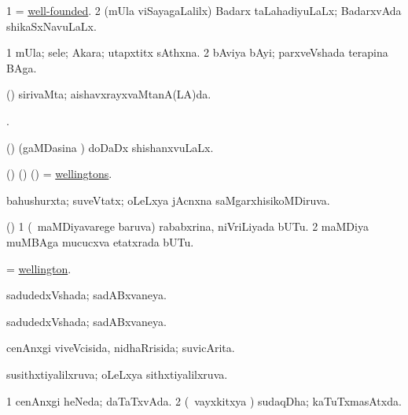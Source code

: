 \bentry
{} 
\gl{\gu}
\expl{}
\bmng
\bnum
\num{1} = \hyperlink{well-founded}{well-founded}. 
\num{2} (mUla viSayagaLalilx) Badarx taLahadiyuLaLx; BadarxvAda shikaSxNavuLaLx. 
\enum
\emng
\eentry

\bentry
{} 
\gl{\nA}
\expl{}
\bmng
\bnum
\num{1} mUla; sele; Akara; utapxtitx sAthxna. 
\num{2} bAviya bAyi; parxveVshada terapina BAga. 
\enum
\emng
\eentry

\bentry
{} 
\gl{\gu}
\expl{}
\bmng
(\AmA) sirivaMta; aishavxrayxvaMtanA(LA)da. 
\emng
\eentry

\bentry
{} 
\bmng
{}  . 
\emng
\eentry

\bentry
{} 
\gl{\gu}
\expl{}
\bmng
(\AmA) (gaMDasina \vi) doDaDx shishanxvuLaLx. 
\emng
\eentry

\bentry
{} 
\gl{\nA}
\expl{}
\bmng
(\bava) (\birx) (\AmA) = \hyperlink{wellington}{wellingtons}. 
\emng
\eentry

\bentry
{} 
\gl{\gu}
\expl{}
\bmng
bahushurxta; suveVtatx; oLeLxya jAcnxna saMgarxhisikoMDiruva. 
\emng
\eentry

\bentry
{} 
\gl{\nA}
\expl{}
\bmng
(\birx) 
\bnum
\num{1} (\sA\ maMDiyavarege baruva) rababxrina, niVriLiyada bUTu. 
\num{2} maMDiya muMBAga mucucxva etatxrada bUTu. 
\enum
\emng
\eentry

\bentry
{} 
\gl{\nA}
\expl{}
\bmng
= \hyperlink{wellington}{wellington}. 
\emng
\eentry

\bentry
{} 
\gl{\gu}
\expl{}
\bmng
sadudedxVshada; sadABxvaneya. 
\emng
\eentry

\bentry
{} 
\gl{\gu}
\expl{}
\bmng
sadudedxVshada; sadABxvaneya. 
\emng
\eentry

\bentry
{} 
\gl{\gu}
\expl{}
\bmng
cenAnxgi viveVcisida, nidhaRrisida; suvicArita. 
\emng
\eentry

\bentry
{} 
\gl{\gu}
\expl{}
\bmng
susithxtiyalilxruva; oLeLxya sithxtiyalilxruva. 
\emng
\eentry

\bentry
{} 
\gl{\gu}
\expl{}
\bmng
\bnum
\num{1} cenAnxgi heNeda; daTaTxvAda. 
\num{2} (\kanmu\ vayxkitxya \vi) sudaqDha; kaTuTxmasAtxda. 
\enum
\emng
\eentry

